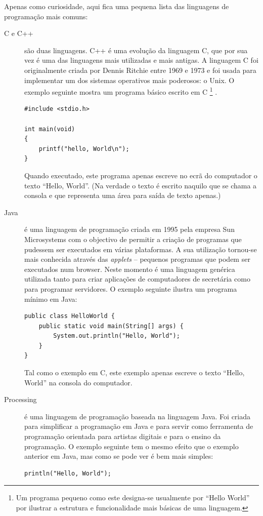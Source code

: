 Apenas como curiosidade, aqui fica uma pequena lista das linguagens de programação mais comuns:
\begin{description}

\item[C e C++] são duas linguagens. C++ é uma evolução da linguagem C, que por sua vez é uma das linguagens mais utilizadas e mais antigas. A linguagem C foi originalmente criada por Dennis Ritchie entre 1969 e 1973 e foi usada para implementar um dos sistemas operativos mais poderosos: o Unix. O exemplo seguinte mostra um programa básico escrito em C%
\footnote{
Um programa pequeno como este designa-se usualmente por ``Hello World'' por ilustrar a estrutura e funcionalidade mais básicas de uma linguagem.
}%
.
\begin{lstlisting}
#include <stdio.h>
 
int main(void)
{
    printf("hello, World\n");
}
\end{lstlisting}
Quando executado, este programa apenas escreve no ecrã do computador o texto ``Hello, World''. (Na verdade o texto é escrito naquilo que se chama a consola e que representa uma área para saída de texto apenas.)

\item[Java] é uma linguagem de programação criada em 1995 pela empresa Sun Microsystems com o objectivo de permitir a criação de programas que pudessem ser executados em várias plataformas. A sua utilização tornou-se mais conhecida através das \emph{applets} -- pequenos programas que podem ser executados num browser. Neste momento é uma linguagem genérica utilizada tanto para criar aplicações de computadores de secretária como para programar servidores.
O exemplo seguinte ilustra um programa mínimo em Java:
\begin{lstlisting}
public class HelloWorld {
	public static void main(String[] args) {
		System.out.println("Hello, World");
    }
}
\end{lstlisting}
Tal como o exemplo em C, este exemplo apenas escreve o texto ``Hello, World'' na consola do computador.

\item[Processing] é uma linguagem de programação baseada na linguagem Java. Foi criada para simplificar a programação em Java e para servir como ferramenta de programação orientada para artistas digitais e para o ensino da programação. O exemplo seguinte tem o mesmo efeito que o exemplo anterior em Java, mas como se pode ver é bem mais simples:
\begin{lstlisting}
println("Hello, World");
\end{lstlisting}


\end{description}

